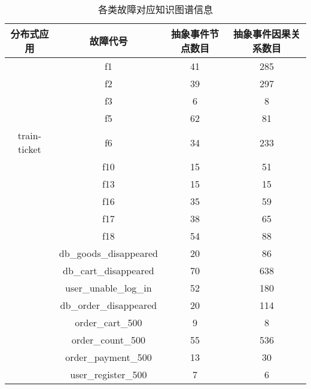 \begin{table}[htbp]
    \caption{各类故障对应知识图谱信息}
    \centering
    \label{kg-abstract-event-num}
    \begin{tabular}{cccc}
    \toprule[2pt]
    分布式应用          & 故障代号                                    & 抽象事件节点数目 & 抽象事件因果关系数目 \\ \midrule[2pt]
                 & f1                                      & 41       & 285        \\
                 & f2                                      & 39       & 297        \\
                 & f3                                      & 6        & 8          \\
                 & f5                                      & 62       & 81         \\
    train-ticket & f6                                      & 34       & 233        \\
                 & f10                                     & 15       & 51         \\
                 & f13                                     & 15       & 15         \\
                 & f16                                     & 35       & 59         \\
                 & f17                                     & 38       & 65         \\
                 & f18                                     & 54       & 88         \\ \midrule[1pt]
                 & db\_goods\_disappeared                  & 20       & 86         \\
                 & db\_cart\_disappeared                   & 70       & 638        \\
                 & user\_unable\_log\_in                   & 52       & 180        \\
                 & db\_order\_disappeared                  & 20       & 114        \\
                 & order\_cart\_500                        & 9        & 8          \\
                 & order\_count\_500                       & 55       & 536        \\
                 & order\_payment\_500                     & 13       & 30         \\
                 & user\_register\_500                     & 7        & 6          \\

\end{tabular}
\end{table}
